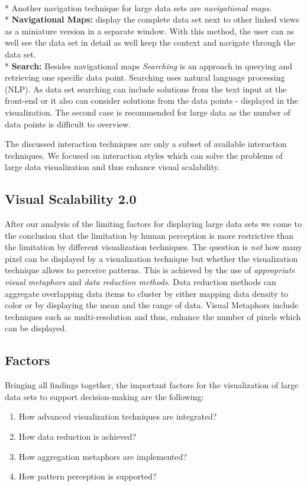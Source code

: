 \\*
Another navigation technique for large data sets are \textit{navigational maps}.\\*
\textbf{Navigational Maps: } display the complete data set next to other linked views as a miniature version in a separate window. With this method, the user can as well see the data set in detail as well keep the context and navigate through the data set.\\*
\textbf{Search: } Besides navigational maps \textit{Searching} is an approach in querying and retrieving one specific data point. Searching uses natural language processing (NLP). As data set searching can include solutions from the text input at the front-end or it also can consider solutions from the data points - displayed in the visualization. The second case is recommended for large data as the number of data points is difficult to overview.

The discussed interaction techniques are only a subset of available interaction techniques. We focused on interaction styles which can solve the problems of large data visualization and thus enhance visual scalability\cite{Tegarden1999}.


\subsection{Visual Scalability 2.0}
After our analysis of the limiting factors for displaying large data sets we come to the conclusion that the limitation by human perception is more restrictive than the limitation by different visualization techniques. The question is \textit{not} how many pixel can be displayed by a visualization technique but whether the visualization technique allows to perceive patterns. This is achieved by the use of \textit{appropriate visual metaphors} and \textit{data reduction methods}. Data reduction methods can aggregate overlapping data items to cluster by either mapping data density to color or by displaying the mean and the range of data. Visual Metaphors include techniques such as multi-resolution and thus, enhance the number of pixels which can be displayed. 

\subsection{Factors}
Bringing all findings together, the important factors for the visualization of large data sets to support decision-making are the following: 
\begin{enumerate}
\item How advanced visualization techniques are integrated? 
\item How data reduction is achieved? 
\item How aggregation metaphors are implemented? 
\item How pattern perception is supported? 
\end{enumerate}

